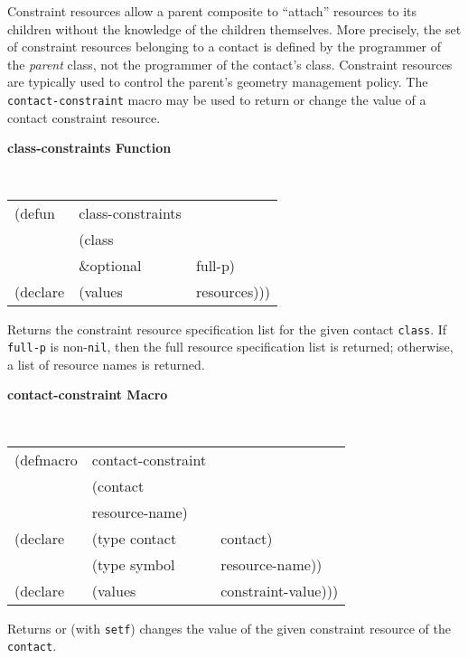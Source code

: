 \documentclass[twoside]{book}
\begin{document}
\begin{sloppy}
Constraint resources allow a parent composite to ``attach'' resources to
its children without the knowledge of the children themselves. More
precisely, the set of constraint resources belonging to a contact is
defined by the programmer of the {\em parent} class, not the programmer
of the contact's class. Constraint resources are typically used to
control the parent's geometry management policy. The {\tt
contact-constraint} macro may be used to return or change the value of a
contact constraint resource. 

{\samepage
{\large {\bf class-constraints \hfill Function}} 
\begin{flushright} \parbox[t]{6.125in}{
\tt
\begin{tabular}{lll}
\raggedright
(defun & class-constraints & \\ 
& (class\\
& \&optional & full-p) \\
(declare &(values  & resources)))
\end{tabular}
\rm

}\end{flushright}}

\begin{flushright} \parbox[t]{6.125in}{
Returns the constraint resource specification list for the given contact
{\tt class}. If
{\tt full-p} is non-{\tt nil}, then the full resource specification list is
returned; otherwise, a list of resource names is returned.

}\end{flushright}

{\samepage
{\large {\bf contact-constraint \hfill Macro}} 
\begin{flushright} \parbox[t]{6.125in}{
\tt
\begin{tabular}{lll}
\raggedright
(defmacro & contact-constraint & \\ 
& (contact\\
& resource-name) \\
(declare & (type contact & contact)\\
         & (type symbol  & resource-name))\\
(declare &(values  & constraint-value)))
\end{tabular}
\rm

}\end{flushright}}

\begin{flushright} \parbox[t]{6.125in}{
Returns or (with {\tt setf}) changes the value of the given constraint
resource of the {\tt contact}.

}
\end{flushright}
\end{sloppy}
\end{document}
